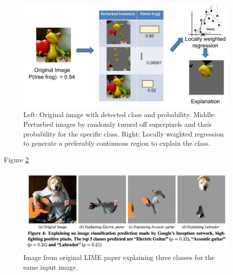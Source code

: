 \begin{figure}[H]
\centering
\includegraphics[width=14cm]{chapters/02_methods/images/lime2.jpg}
\caption{Left: Original image with detected class and probability. Middle: Perturbed images by randomly turned off superpixels and their probability for the specific class.
Right: Locally weighted regression to generate a preferably continuous region to explain the class.\cite{limeoreilly}}
\label{lime_perturbed}
\end{figure}

Figure \ref{lime_dog} 

\begin{figure}[H]
\centering
\includegraphics[width=14cm]{chapters/02_methods/images/lime.png}
\caption{Image from original LIME paper explaining three classes for the same input image.}
\label{lime_dog}
\end{figure}
